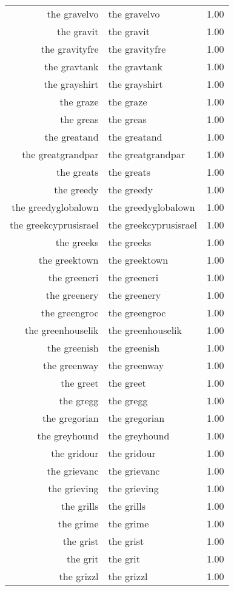 \begin{table}[ht]
\begin{tabular}{rlr}
  the gravelvo & the gravelvo & 1.00 \\ 
  the gravit & the gravit & 1.00 \\ 
  the gravityfre & the gravityfre & 1.00 \\ 
  the gravtank & the gravtank & 1.00 \\ 
  the grayshirt & the grayshirt & 1.00 \\ 
  the graze & the graze & 1.00 \\ 
  the greas & the greas & 1.00 \\ 
  the greatand & the greatand & 1.00 \\ 
  the greatgrandpar & the greatgrandpar & 1.00 \\ 
  the greats & the greats & 1.00 \\ 
  the greedy & the greedy & 1.00 \\ 
  the greedyglobalown & the greedyglobalown & 1.00 \\ 
  the greekcyprusisrael & the greekcyprusisrael & 1.00 \\ 
  the greeks & the greeks & 1.00 \\ 
  the greektown & the greektown & 1.00 \\ 
  the greeneri & the greeneri & 1.00 \\ 
  the greenery & the greenery & 1.00 \\ 
  the greengroc & the greengroc & 1.00 \\ 
  the greenhouselik & the greenhouselik & 1.00 \\ 
  the greenish & the greenish & 1.00 \\ 
  the greenway & the greenway & 1.00 \\ 
  the greet & the greet & 1.00 \\ 
  the gregg & the gregg & 1.00 \\ 
  the gregorian & the gregorian & 1.00 \\ 
  the greyhound & the greyhound & 1.00 \\ 
  the gridour & the gridour & 1.00 \\ 
  the grievanc & the grievanc & 1.00 \\ 
  the grieving & the grieving & 1.00 \\ 
  the grills & the grills & 1.00 \\ 
  the grime & the grime & 1.00 \\ 
  the grist & the grist & 1.00 \\ 
  the grit & the grit & 1.00 \\ 
  the grizzl & the grizzl & 1.00 \\ 

\end{tabular}
\end{table}
